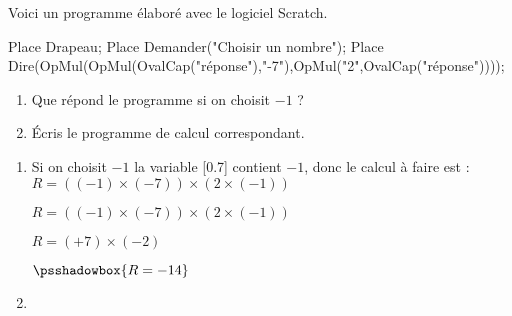 \begin{exercice*}
    Voici un programme élaboré avec le logiciel Scratch.
    \begin{Scratch}[Echelle=0.75]
        Place Drapeau;
        Place Demander("Choisir un nombre");
        Place Dire(OpMul(OpMul(OvalCap("réponse"),"-7"),OpMul("2",OvalCap("réponse"))));
    \end{Scratch}
        \begin{enumerate}
            \item Que répond le programme si on choisit $-1$ ?
            \item Écris le programme de calcul correspondant.
        \end{enumerate}
\end{exercice*}
\begin{corrige}
    \phantom{rrr}    
        \begin{enumerate}
            \item Si on choisit $-1$ la variable
            \raisebox{-0.3\totalheight}[0.7\totalheight]{\raisebox{\depth}{
            \begin{Scratch}[Echelle=0.75]
                Place OvalCap("réponse");
            \end{Scratch}
            }}
            contient $-1$, donc le calcul à faire est : $ R = \left( (-1)\times (-7) \right)\times\left(2\times (-1)\right) $

            $ R = \left( (-1)\times (-7) \right)\times\left(2\times (-1)\right) $
            
            $ R = \left( +7 \right)\times\left(-2 \right) $

            $ \psshadowbox{R = -14} $

            \medskip
            \item 
        \end{enumerate}
\end{corrige}